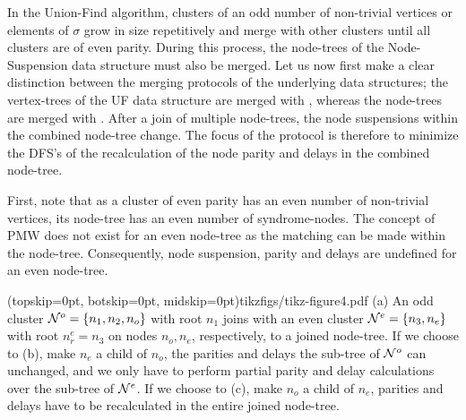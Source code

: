 In the Union-Find algorithm, clusters of an odd number of non-trivial vertices or elements of $\sigma$ grow in size repetitively and merge with other clusters until all clusters are of even parity. During this process, the node-trees of the Node-Suspension data structure must also be merged. Let us now first make a clear distinction between the merging protocols of the underlying data structures; the vertex-trees of the UF data structure are merged with , whereas the node-trees are merged with . After a join of multiple node-trees, the node suspensions within the combined node-tree change. The focus of the  protocol is therefore to minimize the DFS's of the recalculation of the node parity and delays in the combined node-tree. 

First, note that as a cluster of even parity has an even number of non-trivial vertices, its node-tree has an even number of syndrome-nodes. The concept of PMW does not exist for an even node-tree as the matching can be made within the node-tree. Consequently, node suspension, parity and delays are undefined for an even node-tree. 

\Figure[hbt](topskip=0pt, botskip=0pt, midskip=0pt){tikzfigs/tikz-figure4.pdf}{
    (a) An odd cluster $\mathcal{N}^o=\{n_1, n_2, n_o\}$ with root $n_1$ joins with an even cluster $\mathcal{N}^e=\{n_3, n_e\}$ with root $n^e_r=n_3$ on nodes $n_o, n_e$, respectively, to a joined node-tree. If we choose to (b), make $n_e$ a child of $n_o$, the parities and delays the sub-tree of $\mathcal{N}^o$ can unchanged, and we only have to perform partial parity and delay calculations over the sub-tree of $\mathcal{N}^e$. If we choose to (c), make $n_o$ a child of $n_e$, parities and delays have to be recalculated in the entire joined node-tree. \label{fig4}}

